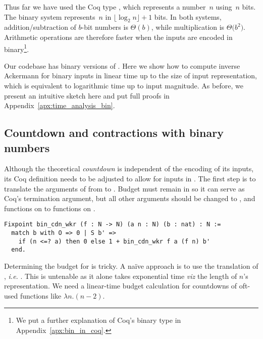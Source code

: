 Thus far we have used the Coq type , which represents 
a number~$n$ using~$n$ bits. 
The binary system represents~$n$ in $\lfloor \log_{2} n \rfloor + 1$ bits.
In both systems, addition/subtraction of $b$-bit 
numbers is $\Theta(b)$, while multiplication is $\Theta \big(b^2\big)$. 
Arithmetic operations are therefore faster when the inputs 
are encoded in binary\footnote{We put a further explanation of 
Coq's binary type  in Appendix~\ref{apx:bin_in_coq}.}.

Our codebase has binary versions of . 
Here we show how to compute inverse Ackermann for binary inputs in 
linear time up to the size of input representation, 
which is equivalent to logarithmic time up to input magnitude.
As before, we present an intuitive sketch here and put 
full proofs in Appendix~\ref{apx:time_analysis_bin}.

\subsection{Countdown and contractions with binary numbers}

\renewcommand{\Tleb}{\runtime_{\li{N.leb}}}
\renewcommand{\Tsucc}{\runtime_{\li{N.succ}}}

Although the theoretical \emph{countdown} is independent of the encoding 
of its inputs, its Coq definition needs to be adjusted to allow for inputs 
in . The first step is to translate the arguments of 
 from  to . Budget  must 
remain in  so it can serve as Coq's termination argument, 
but all other  arguments should be changed 
to , and functions on  to functions on .
\begin{lstlisting}
Fixpoint bin_cdn_wkr (f : N -> N) (a n : N) (b : nat) : N :=
  match b with O => 0 | S b' => 
    if (n <=? a) then 0 else 1 + bin_cdn_wkr f a (f n) b'
  end.
\end{lstlisting}

Determining the budget for  is tricky. 
A naïve approach is to use the  translation of , 
\emph{i.e.} . This is untenable as it alone 
takes exponential time \emph{viz} the length of $n$'s representation.
We need a linear-time budget calculation for countdowns 
of oft-used functions like $\lambda n.(n-2)$.

